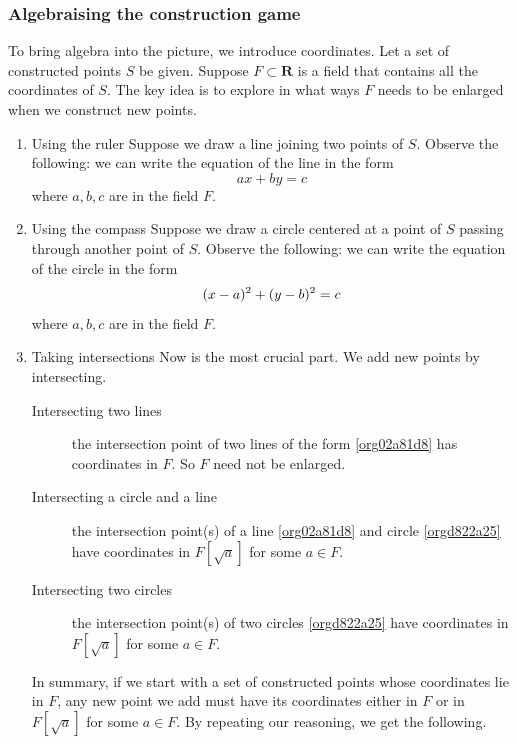 \documentclass[11pt]{article}
\begin{document}
\subsubsection{Algebraising the construction game}
\label{sec:orge6b3b67}
To bring algebra into the picture, we introduce coordinates.
Let a set of constructed points \(S\) be given.
Suppose \(F \subset \mathbf{R}\) is a field that contains all the coordinates of \(S\).
The key idea is to explore in what ways \(F\) needs to be enlarged when we construct new points.
\begin{enumerate}
\item Using the ruler
\label{sec:org94738e4}
Suppose we draw a line joining two points of \(S\).
Observe the following: we can write the equation of the line in the form
\begin{equation}
ax + by = c
\label{org02a81d8}
\end{equation}
where \(a,b,c\) are in the field \(F\).
\item Using the compass
\label{sec:org221199a}
Suppose we draw a circle centered at a point of \(S\) passing through another point of \(S\).
Observe the following: we can write the equation of the circle in the form
\begin{equation}
(x-a)\textsuperscript{2} + (y-b)\textsuperscript{2} = c
\label{orgd822a25}
\end{equation}
where \(a,b,c\) are in the field \(F\).
\item Taking intersections
\label{sec:org4105883}
Now is the most crucial part.  We add new points by intersecting.
\begin{description}
\item[{Intersecting two lines}] the intersection point of two lines of the form \ref{org02a81d8} has coordinates in \(F\).  So \(F\) need not be enlarged.
\item[{Intersecting a circle and a line}] the intersection point(s) of a line \ref{org02a81d8} and circle \ref{orgd822a25} have coordinates in \(F[\sqrt a]\) for some \(a \in F\).
\item[{Intersecting two circles}] the intersection point(s) of two circles \ref{orgd822a25} have coordinates in \(F[\sqrt a]\) for some \(a \in F\).
\end{description}

In summary, if we start with a set of constructed points whose coordinates lie in \(F\), any new point we add must have its coordinates either in \(F\) or in \(F[\sqrt a]\) for some \(a \in F\).  By repeating our reasoning, we get the following.
\end{enumerate}
\end{document}
